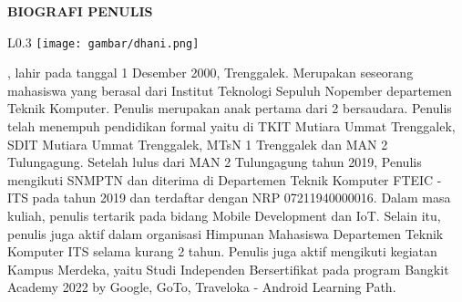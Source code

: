 \begin{center}
  \Large
  \textbf{BIOGRAFI PENULIS}
\end{center}


\vspace{2ex}

\begin{wrapfigure}{L}{0.3\textwidth}
  \centering
  \vspace{-3ex}
  \texttt{[image: gambar/dhani.png]}
  \vspace{-4ex}
\end{wrapfigure}

\name{}, lahir pada \linebreak tanggal 1 Desember 2000, Trenggalek. Merupakan seseorang \linebreak mahasiswa yang berasal dari Institut Teknologi
Sepuluh \linebreak Nopember departemen Teknik Komputer. Penulis merupakan anak pertama dari 2 bersaudara. 
Penulis telah menempuh \linebreak pendidikan formal yaitu di TKIT Mutiara Ummat Trenggalek, SDIT Mutiara Ummat Trenggalek, MTsN 1 Trenggalek dan MAN 2 Tulungagung.
Setelah lulus dari MAN 2 Tulungagung tahun 2019, Penulis mengikuti SNMPTN dan diterima di Departemen Teknik Komputer FTEIC - ITS pada tahun 2019 dan terdaftar dengan NRP 07211940000016.
Dalam masa kuliah, penulis tertarik pada bidang Mobile Development dan IoT. Selain itu, penulis juga aktif dalam organisasi Himpunan Mahasiswa \linebreak Departemen Teknik Komputer ITS selama kurang 2 tahun.
Penulis juga aktif mengikuti kegiatan Kampus Merdeka, yaitu Studi Independen Bersertifikat pada program Bangkit Academy 2022 by Google, GoTo, Traveloka - Android Learning Path.

